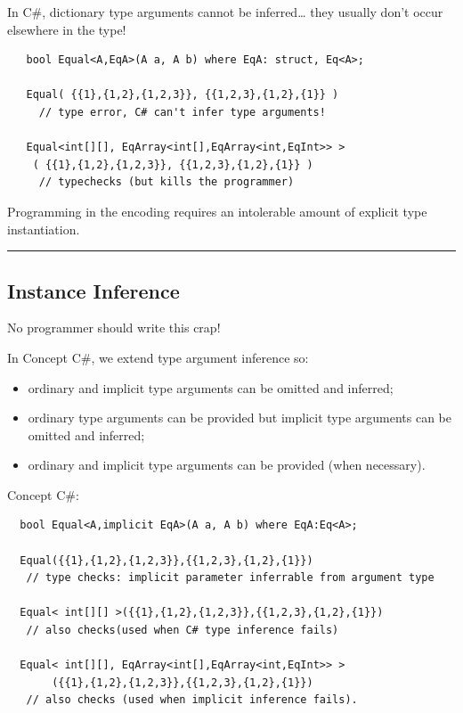 In C\#, dictionary type arguments cannot be inferred\ldots{} they
usually don't occur elsewhere in the type!

\begin{lstlisting}
   bool Equal<A,EqA>(A a, A b) where EqA: struct, Eq<A>;

   Equal( {{1},{1,2},{1,2,3}}, {{1,2,3},{1,2},{1}} ) 
     // type error, C# can't infer type arguments!
   
   Equal<int[][], EqArray<int[],EqArray<int,EqInt>> >
    ( {{1},{1,2},{1,2,3}}, {{1,2,3},{1,2},{1}} ) 
     // typechecks (but kills the programmer)
\end{lstlisting}

Programming in the encoding requires an intolerable amount of explicit
type instantiation.

\begin{center}\rule{0.5\linewidth}{\linethickness}\end{center}

\subsection{Instance Inference}\label{instance-inference}

No programmer should write this crap!

In Concept C\#, we extend type argument inference so:

\begin{itemize}
\tightlist
\item
  ordinary and implicit type arguments can be omitted and inferred;
\item
  ordinary type arguments can be provided but implicit type arguments
  can be omitted and inferred;
\item
  ordinary and implicit type arguments can be provided (when necessary).
\end{itemize}

Concept C\#:

\begin{lstlisting}
  bool Equal<A,implicit EqA>(A a, A b) where EqA:Eq<A>;

  Equal({{1},{1,2},{1,2,3}},{{1,2,3},{1,2},{1}}) 
   // type checks: implicit parameter inferrable from argument type

  Equal< int[][] >({{1},{1,2},{1,2,3}},{{1,2,3},{1,2},{1}}) 
   // also checks(used when C# type inference fails)

  Equal< int[][], EqArray<int[],EqArray<int,EqInt>> >
       ({{1},{1,2},{1,2,3}},{{1,2,3},{1,2},{1}})
   // also checks (used when implicit inference fails).
\end{lstlisting}

